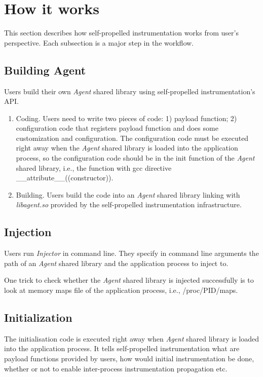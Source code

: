 \section{How it works}
This section describes how self-propelled instrumentation works from user's
perspective. Each subsection is a major step in the workflow.

\subsection{Building Agent}
Users build their own {\em Agent} shared library using self-propelled
instrumentation's API.
\begin{enumerate}
\item Coding. Users need to write two pieces of code: 1) payload function; 2)
  configuration code that registers payload function and does some customization
  and configuration. The configuration code must be executed right away when the
  {\em Agent} shared library is loaded into the application process, so the
  configuration code should be in the init function of the {\em Agent} shared
  library, i.e., the function with gcc directive
  \_\_attribute\_\_((constructor)).
\item Building. Users build the code into an {\em Agent} shared library linking
  with {\em libagent.so} provided by the self-propelled instrumentation
  infrastructure.
\end{enumerate}

\subsection{Injection}
Users run {\em Injector} in command line. They specify in command line arguments
the path of an {\em Agent} shared library and the application process to inject
to.

One trick to check whether the {\em Agent} shared library is injected
successfully is to look at memory maps file of the application process, i.e.,
/proc/PID/maps.

\subsection{Initialization} %

The initialisation code is executed right away when {\em Agent} shared library
is loaded into the application process.
It tells self-propelled instrumentation what are payload functions provided by
users, how would initial instrumentation be done, whether or not to enable
inter-process instrumentation propagation etc.

